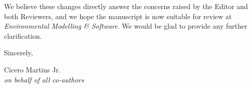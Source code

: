 \documentclass[11pt]{article}
\begin{document}
\vspace{0.3cm}
We believe these changes directly answer the concerns raised by the Editor
and both Reviewers, and we hope the manuscript is now suitable for review at
\textit{Environmental Modelling \& Software}. We would be glad to provide any
further clarification.

\vspace{0.5cm}
Sincerely,

\vspace{0.3cm}
Cicero Martins Jr.\\
\textit{on behalf of all co-authors}
\end{document}
